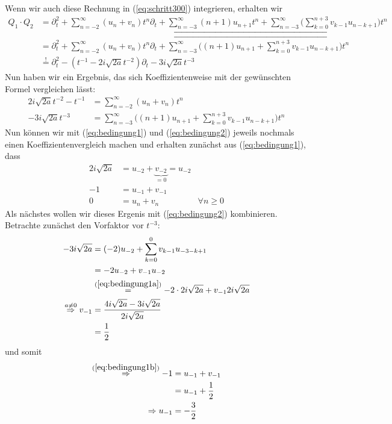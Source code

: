 Wenn wir auch diese Rechnung in (\ref{eq:schritt300}) integrieren, erhalten wir
\begin{equation} \label{eq:schritt400}
  \begin{aligned}
Q_1\cdot Q_2&=\partial_t^2 + \sum_{n=-2}^\infty (u_n+v_n)t^n \partial_t
  + \underbracket{\sum_{n=-3}^\infty (n+1)u_{n+1}t^{n}
  + \sum_{n=-3}^\infty \Big( \sum_{k=0}^{n+3} v_{k-1}u_{n-k+1} \Big) t^{n}}
\\&=\partial_t^2 + \sum_{n=-2}^\infty (u_n+v_n)t^n \partial_t
  + \overbracket{\sum_{n=-3}^\infty
  \Big( (n+1)u_{n+1} + \sum_{k=0}^{n+3} v_{k-1}u_{n-k+1} \Big) t^{n}}
\\&\overset{!}{=} \partial_t^2 - (t^{-1} - 2i\sqrt{2a}t^{-2})\partial_t
  - 3 i\sqrt{2a}t^{-3}
  \end{aligned}
\end{equation}
Nun haben wir ein Ergebnis, das sich Koeffizientenweise mit der gewünschten
Formel vergleichen lässt:
\begin{align}
\label{eq:bedingung1}
2i\sqrt{2a}t^{-2} - t^{-1} &= \sum_{n=-2}^\infty (u_n+v_n)t^n
\\
\label{eq:bedingung2}
- 3 i\sqrt{2a}t^{-3} &= \sum_{n=-3}^\infty
  \Big( (n+1)u_{n+1} + \sum_{k=0}^{n+3} v_{k-1}u_{n-k+1} \Big) t^{n}
\end{align}
Nun können wir mit (\ref{eq:bedingung1}) und (\ref{eq:bedingung2}) jeweils
nochmals einen Koeffizientenvergleich machen und erhalten zunächst aus
(\ref{eq:bedingung1}), dass
\begin{align}
2i\sqrt{2a} &= u_{-2} + \underset{=0}{\underbrace{v_{-2}}} = u_{-2}
\label{eq:bedingung1a}
\\-1 &= u_{-1} + v_{-1}
\label{eq:bedingung1b}
\\0 &= u_n + v_n & \forall n \geq 0
\label{eq:bedingung1c}
\end{align}
Als nächstes wollen wir dieses Ergenis mit (\ref{eq:bedingung2}) kombinieren.
Betrachte zunächst den Vorfaktor vor $t^{-3}$:
\begin{align*}
- 3 i\sqrt{2a} &= (-2)u_{-2} + \sum_{k=0}^{0} v_{k-1}u_{-3-k+1}
\\&= -2u_{-2} + v_{-1}u_{-2}
\\&\overset{(\ref{eq:bedingung1a})}{=} -2\cdot2i\sqrt{2a} + v_{-1}2i\sqrt{2a}
\\\overset{a\neq0}{\Rightarrow} v_{-1}
  &= \frac{4i\sqrt{2a}-3i\sqrt{2a}}{2i\sqrt{2a}}
\\&= \frac{1}{2}
\end{align*}
und somit
\begin{align*}
\overset{(\ref{eq:bedingung1b})}{\Rightarrow} -1 &=u_{-1}+v_{-1}
\\ &=u_{-1}+\frac{1}{2}
\\\Rightarrow u_{-1}&=-\frac{3}{2}
\end{align*}
